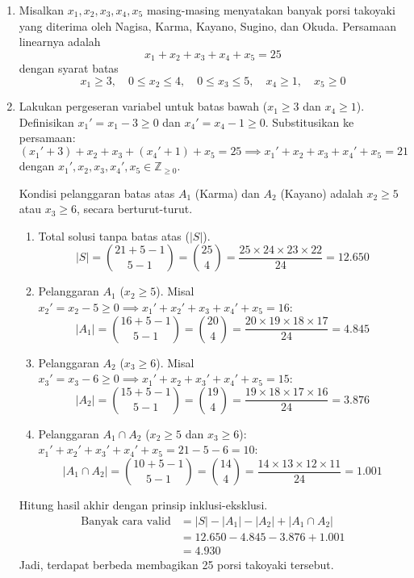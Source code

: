 \documentclass[12pt,a4paper]{article}
\begin{document}
\begin{enumerate}[label=(\alph*)]
    \item Misalkan $x_1, x_2, x_3, x_4, x_5$ masing-masing menyatakan banyak porsi takoyaki yang diterima oleh Nagisa, Karma, Kayano, Sugino, dan Okuda. Persamaan linearnya adalah
    \[ x_1 + x_2 + x_3 + x_4 + x_5 = 25 \]
    dengan syarat batas
    \[ x_1 \geq 3, \quad 0 \leq x_2 \leq 4, \quad 0 \leq x_3 \leq 5, \quad x_4 \geq 1, \quad x_5 \geq 0 \]

    \item Lakukan pergeseran variabel untuk batas bawah ($x_1 \geq 3$ dan $x_4 \geq 1$). Definisikan $x_1' = x_1 - 3 \geq 0$ dan $x_4' = x_4 - 1 \geq 0$. Substitusikan ke persamaan:
    \[ (x_1' + 3) + x_2 + x_3 + (x_4' + 1) + x_5 = 25 \implies x_1' + x_2 + x_3 + x_4' + x_5 = 21 \]
    dengan $x_1', x_2, x_3, x_4', x_5 \in \mathbb{Z}_{\geq 0}$.
    
    Kondisi pelanggaran batas atas $A_1$ (Karma) dan $A_2$ (Kayano) adalah $x_2 \geq 5$ atau $x_3 \geq 6$, secara berturut-turut.

    \begin{enumerate}[label=\arabic*.]
        \item Total solusi tanpa batas atas ($|S|$).
        \[ |S| = \binom{21+5-1}{5-1} = \binom{25}{4} = \frac{25 \times 24 \times 23 \times 22}{24} = 12.650 \]

        \item Pelanggaran $A_1$ ($x_2 \geq 5$).
        Misal $x_2' = x_2 - 5 \ge 0 \implies x_1' + x_2' + x_3 + x_4' + x_5 = 16$:
        \[ |A_1| = \binom{16+5-1}{5-1} = \binom{20}{4} = \frac{20 \times 19 \times 18 \times 17}{24} = 4.845 \]

        \item Pelanggaran $A_2$ ($x_3 \geq 6$).
        Misal $x_3' = x_3 - 6 \ge 0 \implies x_1' + x_2 + x_3' + x_4' + x_5 = 15$:
        \[ |A_2| = \binom{15+5-1}{5-1} = \binom{19}{4} = \frac{19 \times 18 \times 17 \times 16}{24} = 3.876 \]

    \item Pelanggaran $A_1 \cap A_2$ ($x_2 \geq 5$ dan $x_3 \geq 6$):
        $x_1' + x_2' + x_3' + x_4' + x_5 = 21 - 5 - 6 = 10$:
        \[ |A_1 \cap A_2| = \binom{10+5-1}{5-1} = \binom{14}{4} = \frac{14 \times 13 \times 12 \times 11}{24} = 1.001 \]
    \end{enumerate}

    Hitung hasil akhir dengan prinsip inklusi-eksklusi.
    \begin{align*}
        \text{Banyak cara valid} &= |S| - |A_1| - |A_2| + |A_1 \cap A_2| \\
        &= 12.650 - 4.845 - 3.876 + 1.001 \\
        &= 4.930
    \end{align*}
    Jadi, terdapat  berbeda membagikan 25 porsi takoyaki tersebut.
\end{enumerate}
\end{document}
